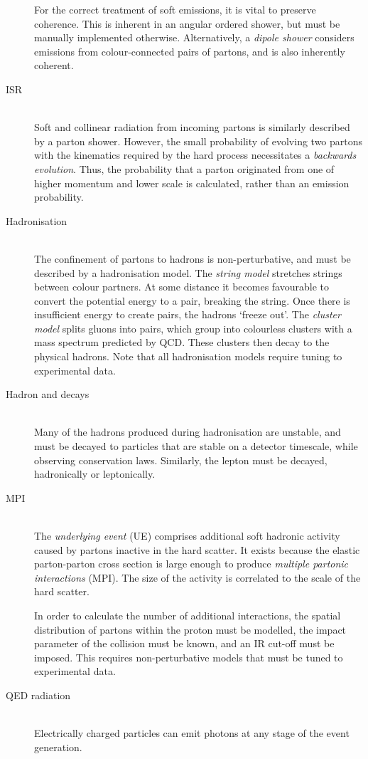 \begin{description}
	For the correct treatment of soft emissions, it is vital to preserve coherence. This 
	is inherent in an angular ordered shower, but must be manually implemented otherwise. 
	Alternatively, a \textit{dipole shower} considers emissions from colour-connected 
	pairs of partons, and is also inherently coherent.
\item[\ac{ISR}] \hfill \\
	Soft and collinear radiation from incoming partons is similarly described by a parton 
	shower. However, the small probability of evolving two partons with the kinematics 
	required by the hard process necessitates a \textit{backwards evolution}. Thus, the 
	probability that a parton originated from one of higher momentum and lower scale is 
	calculated, rather than an emission probability.
\item[Hadronisation] \hfill \\
	The confinement of partons to hadrons is non-perturbative, and must be described by a 
	hadronisation model. The \textit{string model} stretches strings between colour 
	partners. At some distance it becomes favourable to convert the potential energy to a 
	\HepProcess{\Pquark \APquark} pair, breaking the string. Once there is insufficient 
	energy to create \HepProcess{\Pquark \APquark} pairs, the hadrons `freeze out'. The 
	\textit{cluster model} splits gluons into \HepProcess{\Pquark \APquark} pairs, which 
	group into colourless clusters with a mass spectrum predicted by \ac{QCD}. These 
	clusters then decay to the physical hadrons. Note that all hadronisation models 
	require tuning to experimental data.
\item[Hadron and \Ptau decays] \hfill \\
	Many of the hadrons produced during hadronisation are unstable, and must be decayed to
	particles that are stable on a detector timescale, while observing conservation laws. 
	Similarly, the \Ptau lepton must be decayed, hadronically or leptonically.
\item[\ac{MPI}] \hfill \\
	The \textit{underlying event} (UE) comprises additional soft hadronic activity caused 
	by partons inactive in the hard scatter. It exists because the elastic parton-parton 
	cross section is large enough to produce 
	\textit{multiple partonic interactions} (MPI). The size of the activity is correlated 
	to the scale of the hard scatter. 

	In order to calculate the number of additional interactions, the spatial distribution 
	of partons within the proton must be modelled, the impact parameter of the \pp 
	collision must be known, and an IR cut-off must be imposed. This requires 
	non-perturbative models that must be tuned to experimental data.
\item[\acs{QED} radiation] \hfill \\
	Electrically charged particles can emit photons at any stage of the event generation.
\end{description}




